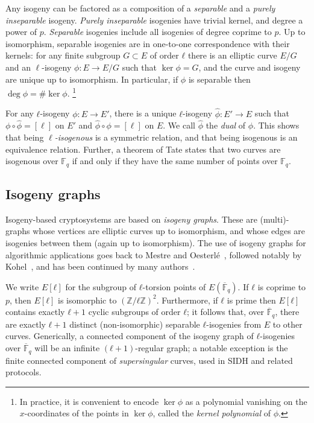 \documentclass{llncs}
\newcommand{\F}{\mathbb{F}}
\newcommand{\Fbar}{\overline{\mathbb{F}}}
\begin{document}
Any isogeny can be factored as a composition of a \emph{separable} and
a \emph{purely inseparable} isogeny. \emph{Purely inseparable}
isogenies have trivial kernel, and degree a power of $p$.
\emph{Separable} isogenies include all
isogenies of degree coprime to $p$.
Up to isomorphism, separable isogenies
are in one-to-one correspondence with their kernels:
for any finite subgroup $G⊂E$ of order $ℓ$ there is 
an elliptic curve $E/G$ and an $\ell$-isogeny $\phi: E \to E/G$
such that $\ker \phi = G$,
and the curve and isogeny are unique up to isomorphism.
In particular, if $\phi$ is separable then $\deg ϕ=\#\ker ϕ$.
\footnote{In practice, it is convenient to encode $\ker\phi$ as
	a polynomial vanishing on the $x$-coordinates of the points
	in $\ker\phi$, called the \emph{kernel polynomial} of $\phi$.
}

For any $ℓ$-isogeny $ϕ:E→E'$, there is a unique $ℓ$-isogeny
$\hat{ϕ}:E'→E$ such that $ϕ∘\hat{ϕ} = [\ell]$ on $E'$
and $\hat{ϕ}∘ϕ = [\ell]$ on $E$.
We call $\hat{ϕ}$ the \emph{dual} of $ϕ$. This
shows that being \emph{$\ell$-isogenous} is a symmetric
relation, and that being isogenous is an equivalence relation.
 Further, a theorem of Tate states that two curves are
isogenous over $\F_q$ if and only if they have the same number of
points over $\F_q$.


\subsection{Isogeny graphs}
\label{sec:isogeny-graphs}

Isogeny-based cryptosystems are based on \emph{isogeny graphs}.
These are
(multi)-graphs whose vertices are
elliptic curves up to isomorphism, and whose edges are isogenies
between them (again up to isomorphism).
The use of isogeny graphs for algorithmic applications 
goes back to Mestre and Oesterlé~\cite{Mestre},
followed notably by Kohel~\cite{kohel},
and has been continued by many
authors~\cite{Gal,fouquet+morain02,GHS,MiretMSTV06,jao+miller+venkatesan09}.

We write $E[ℓ]$ for the subgroup of $ℓ$-torsion points of
$E(\Fbar_q)$.  If $ℓ$ is coprime to $p$, then $E[ℓ]$ is isomorphic to
$(ℤ/ℓℤ)^2$.  Furthermore, if $ℓ$ is prime then $E[ℓ]$ contains exactly
$ℓ+1$ cyclic subgroups of order $ℓ$; it follows that, over $\Fbar_q$,
there are exactly $ℓ+1$ distinct (non-isomorphic) separable $ℓ$-isogenies 
from $E$ to other curves.
Generically, a connected component of the isogeny graph of
$ℓ$-isogenies over $\Fbar_q$ will be an infinite $(ℓ+1)$-regular
graph; a notable exception is the finite connected component of
\emph{supersingular} curves, used in SIDH and related protocols.
\end{document}
